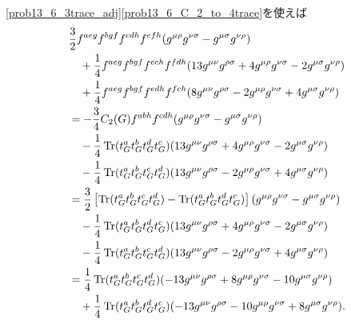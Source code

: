 \eqref{prob13_6_3trace_adj}\eqref{prob13_6_C_2_to_4trace}を使えば
\begin{align*}
  & \frac{3}{2} f^{aeg} f^{bgf} f^{cdh} f^{efh} (g^{\mu\rho} g^{\nu\sigma} - g^{\mu\sigma} g^{\nu\rho}) \\
  &\quad + \frac{1}{4} f^{aeg} f^{bgf} f^{ech} f^{fdh} (13 g^{\mu\nu} g^{\rho\sigma} + 4g^{\mu\rho} g^{\nu\sigma} - 2g^{\mu\sigma} g^{\nu\rho})  \\
  &\quad + \frac{1}{4} f^{aeg} f^{bgf} f^{edh} f^{fch} (8 g^{\mu\nu} g^{\rho\sigma} - 2g^{\mu\rho} g^{\nu\sigma} + 4g^{\mu\sigma} g^{\nu\rho}) \\
  &= - \frac{3}{4} C_2(G) f^{abh} f^{cdh} (g^{\mu\rho} g^{\nu\sigma} - g^{\mu\sigma} g^{\nu\rho}) \\
  &\quad - \frac{1}{4} \operatorname{Tr}(t_G^a t_G^b t_G^d t_G^c) (13 g^{\mu\nu} g^{\rho\sigma} + 4g^{\mu\rho} g^{\nu\sigma} - 2g^{\mu\sigma} g^{\nu\rho})  \\
  &\quad - \frac{1}{4} \operatorname{Tr}(t_G^a t_G^b t_G^c t_G^d) (13 g^{\mu\nu} g^{\rho\sigma} - 2g^{\mu\rho} g^{\nu\sigma} + 4g^{\mu\sigma} g^{\nu\rho}) \\
  &= \frac{3}{2} \left[\operatorname{Tr}(t_G^a t_G^b t_G^c t_G^d) - \operatorname{Tr}(t_G^a t_G^b t_G^d t_G^c)\right] (g^{\mu\rho} g^{\nu\sigma} - g^{\mu\sigma} g^{\nu\rho}) \\
  &\quad - \frac{1}{4} \operatorname{Tr}(t_G^a t_G^b t_G^d t_G^c) (13 g^{\mu\nu} g^{\rho\sigma} + 4g^{\mu\rho} g^{\nu\sigma} - 2g^{\mu\sigma} g^{\nu\rho})  \\
  &\quad - \frac{1}{4} \operatorname{Tr}(t_G^a t_G^b t_G^c t_G^d) (13 g^{\mu\nu} g^{\rho\sigma} - 2g^{\mu\rho} g^{\nu\sigma} + 4g^{\mu\sigma} g^{\nu\rho}) \\
  &= \frac{1}{4} \operatorname{Tr}(t_G^a t_G^b t_G^c t_G^d) (-13 g^{\mu\nu} g^{\rho\sigma} + 8g^{\mu\rho} g^{\nu\sigma} - 10 g^{\mu\sigma} g^{\nu\rho}) \\
  &\quad + \frac{1}{4} \operatorname{Tr}(t_G^a t_G^b t_G^d t_G^c) (-13 g^{\mu\nu} g^{\rho\sigma} - 10 g^{\mu\rho} g^{\nu\sigma} + 8g^{\mu\sigma} g^{\nu\rho}) .
\end{align*}

